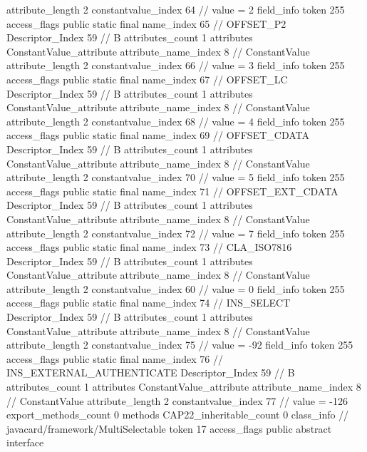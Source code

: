 {{{{{{{					attribute_length	2
					constantvalue_index	64		// value = 2
				}
				}
			}
			field_info {
				token	255
				access_flags	public static final
				name_index	65		// OFFSET_P2
				Descriptor_Index	59		// B
				attributes_count	1
				attributes {
				ConstantValue_attribute {
					attribute_name_index	8		// ConstantValue
					attribute_length	2
					constantvalue_index	66		// value = 3
				}
				}
			}
			field_info {
				token	255
				access_flags	public static final
				name_index	67		// OFFSET_LC
				Descriptor_Index	59		// B
				attributes_count	1
				attributes {
				ConstantValue_attribute {
					attribute_name_index	8		// ConstantValue
					attribute_length	2
					constantvalue_index	68		// value = 4
				}
				}
			}
			field_info {
				token	255
				access_flags	public static final
				name_index	69		// OFFSET_CDATA
				Descriptor_Index	59		// B
				attributes_count	1
				attributes {
				ConstantValue_attribute {
					attribute_name_index	8		// ConstantValue
					attribute_length	2
					constantvalue_index	70		// value = 5
				}
				}
			}
			field_info {
				token	255
				access_flags	public static final
				name_index	71		// OFFSET_EXT_CDATA
				Descriptor_Index	59		// B
				attributes_count	1
				attributes {
				ConstantValue_attribute {
					attribute_name_index	8		// ConstantValue
					attribute_length	2
					constantvalue_index	72		// value = 7
				}
				}
			}
			field_info {
				token	255
				access_flags	public static final
				name_index	73		// CLA_ISO7816
				Descriptor_Index	59		// B
				attributes_count	1
				attributes {
				ConstantValue_attribute {
					attribute_name_index	8		// ConstantValue
					attribute_length	2
					constantvalue_index	60		// value = 0
				}
				}
			}
			field_info {
				token	255
				access_flags	public static final
				name_index	74		// INS_SELECT
				Descriptor_Index	59		// B
				attributes_count	1
				attributes {
				ConstantValue_attribute {
					attribute_name_index	8		// ConstantValue
					attribute_length	2
					constantvalue_index	75		// value = -92
				}
				}
			}
			field_info {
				token	255
				access_flags	public static final
				name_index	76		// INS_EXTERNAL_AUTHENTICATE
				Descriptor_Index	59		// B
				attributes_count	1
				attributes {
				ConstantValue_attribute {
					attribute_name_index	8		// ConstantValue
					attribute_length	2
					constantvalue_index	77		// value = -126
				}
				}
			}
			}
			export_methods_count	0
			methods {
			}
			CAP22_inheritable_count	0
		}
		class_info {		// javacard/framework/MultiSelectable
			token	17
			access_flags	public abstract interface
}}}
